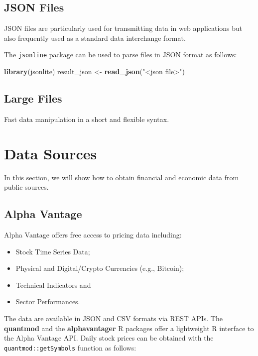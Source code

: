 \documentclass[]{book}
\newenvironment{Shaded}{\begin{snugshade}}{\end{snugshade}}
\newcommand{\KeywordTok}[1]{\textcolor[rgb]{0.13,0.29,0.53}{\textbf{#1}}}
\newcommand{\StringTok}[1]{\textcolor[rgb]{0.31,0.60,0.02}{#1}}
\newcommand{\NormalTok}[1]{#1}
\providecommand{\tightlist}{%
  \setlength{\itemsep}{0pt}\setlength{\parskip}{0pt}}
\theoremstyle{definition}
\theoremstyle{definition}
\theoremstyle{definition}
\theoremstyle{remark}
\begin{document}
\subsection{JSON Files}\label{json-files}

JSON files are particularly used for transmitting data in web
applications but also frequently used as a standard data interchange
format.

The \texttt{jsonline} package can be used to parse files in JSON format
as follows:

\begin{Shaded}
\begin{Highlighting}[]
\KeywordTok{library}\NormalTok{(jsonlite)}
\NormalTok{result_json <-}\StringTok{ }\KeywordTok{read_json}\NormalTok{(}\StringTok{"<json file>"}\NormalTok{)}
\end{Highlighting}
\end{Shaded}

\subsection{Large Files}\label{large-files}

Fast data manipulation in a short and flexible syntax.

\section{Data Sources}\label{data-sources}

In this section, we will show how to obtain financial and economic data
from public sources.

\subsection{Alpha Vantage}\label{alpha-vantage}

Alpha Vantage offers free access to pricing data including:

\begin{itemize}
\tightlist
\item
  Stock Time Series Data;
\item
  Physical and Digital/Crypto Currencies (e.g., Bitcoin);
\item
  Technical Indicators and
\item
  Sector Performances.
\end{itemize}

The data are available in JSON and CSV formats via REST APIs. The
\textbf{quantmod} and the \textbf{alphavantager} R packages offer a
lightweight R interface to the Alpha Vantage API. Daily stock prices can
be obtained with the \texttt{quantmod::getSymbols} function as follows:
\end{document}

